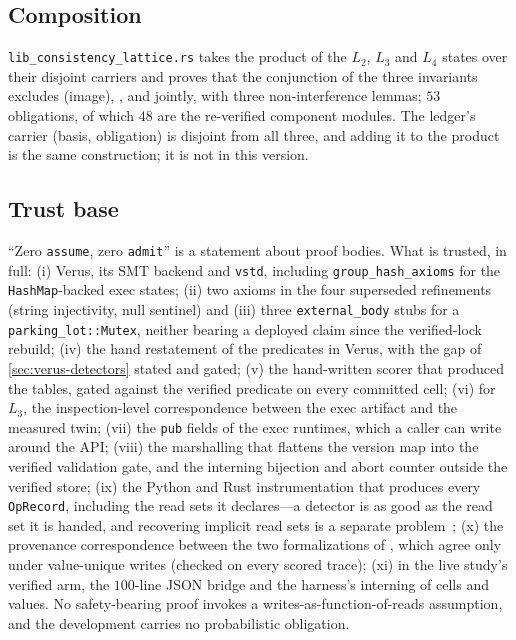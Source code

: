 \subsection{Composition}
\label{sec:composition}
\texttt{lib\_consistency\_lattice.rs} takes the product of the $L_2$, $L_3$
and $L_4$ states over their disjoint carriers and proves that the conjunction
of the three invariants excludes  (image), ,  and  jointly, with
three non-interference lemmas; $53$ obligations, of which $48$ are the
re-verified component modules. The ledger's carrier (basis, obligation) is
disjoint from all three, and adding it to the product is the same
construction; it is not in this version.

\subsection{Trust base}
\label{sec:trust}
``Zero \texttt{assume}, zero \texttt{admit}'' is a statement about proof
bodies. What is trusted, in full: (i) Verus, its SMT backend and
\texttt{vstd}, including \texttt{group\_hash\_axioms} for the
\texttt{HashMap}-backed exec states; (ii) two axioms in the four superseded
refinements (string injectivity, null sentinel) and (iii) three
\texttt{external\_body} stubs for a \texttt{parking\_lot::Mutex}, neither
bearing a deployed claim since the verified-lock rebuild; (iv) the hand
restatement of the \TLA{} predicates in Verus, with the gap of
\cref{sec:verus-detectors} stated and gated; (v) the hand-written scorer that
produced the tables, gated against the verified predicate on every committed
cell; (vi) for $L_3$, the inspection-level correspondence between the exec
artifact and the measured twin; (vii) the \texttt{pub} fields of the exec
runtimes, which a caller can write around the API; (viii) the marshalling
that flattens the version map into the verified validation gate, and the
interning bijection and abort counter outside the verified store; (ix) the
Python and Rust instrumentation that produces every \texttt{OpRecord},
including the read sets it declares---a detector is as good as the read set
it is handed, and recovering implicit read sets is a separate
problem~\cite{Khan2026SBus}; (x) the provenance correspondence between the
two formalizations of , which agree only under value-unique writes
(checked on every scored trace); (xi) in the live study's verified arm, the
$100$-line JSON bridge and the harness's interning of cells and values. No
safety-bearing proof invokes a writes-as-function-of-reads assumption, and
the development carries no probabilistic obligation.
